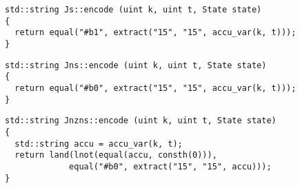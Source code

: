 
\begin{lstlisting}[style=c++,aboveskip=-\encodeskip,belowskip=\encodeskip]
std::string Js::encode (uint k, uint t, State state)
{
  return equal("#b1", extract("15", "15", accu_var(k, t)));
}
\end{lstlisting}


\newpage

\begin{lstlisting}[style=c++,aboveskip=-\encodeskip,belowskip=\encodeskip]
std::string Jns::encode (uint k, uint t, State state)
{
  return equal("#b0", extract("15", "15", accu_var(k, t)));
}
\end{lstlisting}


\begin{lstlisting}[style=c++,aboveskip=-\encodeskip,belowskip=\encodeskip]
std::string Jnzns::encode (uint k, uint t, State state)
{
  std::string accu = accu_var(k, t);
  return land(lnot(equal(accu, consth(0))),
             equal("#b0", extract("15", "15", accu)));
}
\end{lstlisting}


